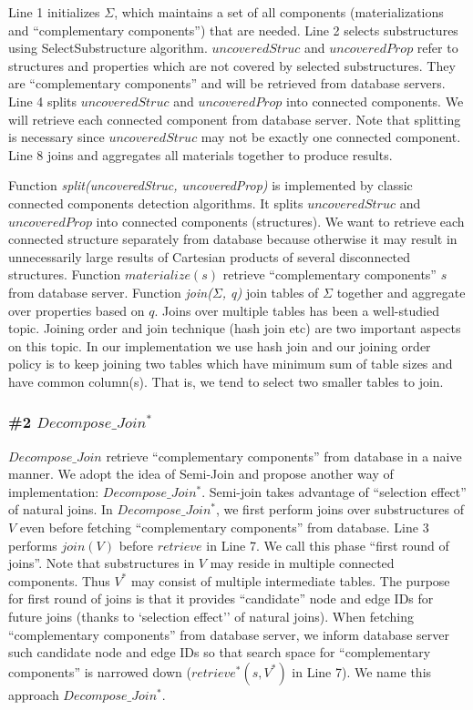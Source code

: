 Line 1 initializes $\Sigma$, which maintains a set of all components (materializations and ``complementary  components'') that are needed. Line 2 selects substructures using SelectSubstructure algorithm. $uncoveredStruc$ and $uncoveredProp$ refer to structures and properties which are not covered by selected substructures. They are ``complementary components'' and will be retrieved from database servers. Line 4 splits $uncoveredStruc$ and $uncoveredProp$ into connected components. We will retrieve each connected component from database server. Note that splitting is necessary since $uncoveredStruc$ may not be exactly one connected component. Line 8 joins and aggregates all materials together to produce results.

Function \textit{split(uncoveredStruc, uncoveredProp)} is implemented by classic connected components detection algorithms. It splits $uncoveredStruc$ and $uncoveredProp$ into connected components (structures). We want to retrieve each connected structure separately from database because otherwise it may result in unnecessarily large results of Cartesian products of several disconnected structures. Function \textit{$materialize(s)$} retrieve ``complementary components'' $s$ from database server. Function \textit{join($\Sigma$, q)} join tables of $\Sigma$ together and aggregate over properties based on $q$. Joins over multiple tables has been a well-studied topic. Joining order and join technique (hash join etc) are two important aspects on this topic. In our implementation we use hash join and our joining order policy is to keep joining two tables which have minimum sum of table sizes and have common column(s). That is, we tend to select two smaller tables to join.

\subsubsection{\#2 $Decompose\_Join^{*}$}
$Decompose\_Join$ retrieve ``complementary components'' from database in a naive manner. We adopt the idea of Semi-Join \cite{DBLP:journals/dr/Ozsoyoglu99} and propose another way of implementation: $Decompose\_Join^{*}$. Semi-join takes advantage of ``selection effect'' of natural joins. In $Decompose\_Join^{*}$, we first perform joins over substructures of $V$ even before fetching ``complementary components'' from database. Line 3 performs $join(V)$ before $retrieve$ in Line 7. We call this phase ``first round of joins''.  Note that substructures in $V$ may reside in multiple connected components. Thus $V^{*}$ may consist of multiple intermediate tables. The purpose for first round of joins is that it provides ``candidate'' node and edge IDs for future joins (thanks to `selection effect'' of natural joins). When fetching ``complementary components'' from database server, we inform database server such candidate node and edge IDs so that search space for ``complementary components'' is narrowed down ($retrieve^{*}(s, V^{*})$ in Line 7). We name this approach $Decompose\_Join^{*}$.

